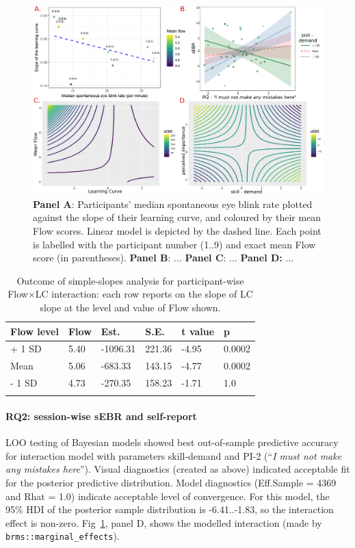 \documentclass[10pt,letterpaper,floatsintext]{article}
\begin{document}
\begin{figure}[!t]
	\centering
	\includegraphics[width=\textwidth]{sEBR_RQ1-2_results}
	\caption{\textbf{Panel A}: Participants' median spontaneous eye blink rate plotted against the slope of their learning curve, and coloured by their mean Flow scores. Linear model is depicted by the dashed line. Each point is labelled with the participant number (1..9) and exact mean Flow score (in parentheses). \textbf{Panel B}: ... \textbf{Panel C}: ... \textbf{Panel D:} ...}
	\label{fig:EBRvLC}
\end{figure}


\begin{table}[!hb]
\centering
\caption{Outcome of simple-slopes analysis for participant-wise Flow$\times$LC interaction: each row reports on the slope of LC slope at the level and value of Flow shown.}
\begin{tabular}{llllll}
\hline
Flow level & Flow & Est. & S.E. & t value & p \\
\hline
+ 1 SD & 5.40 & -1096.31 & 221.36 & -4.95 & 0.0002 \\
Mean   & 5.06 &  -683.33 & 143.15 & -4.77 & 0.0002 \\
- 1 SD & 4.73 &  -270.35 & 158.23 & -1.71 & 1.0 \\
\hline
\label{tab:simpslopes}
\end{tabular}
\end{table}

\paragraph{RQ2: session-wise sEBR and self-report}
LOO testing of Bayesian models showed best out-of-sample predictive accuracy for interaction model with parameters skill-demand and PI-2 (``\textit{I must not make any mistakes here}''). 
Visual diagnostics (created as above) indicated acceptable fit for the posterior predictive distribution. Model diagnostics (Eff.Sample = 4369 and Rhat = 1.0) indicate acceptable level of convergence. For this model, the 95\% HDI of the posterior sample distribution is -6.41..-1.83, so the interaction effect is non-zero. Fig~\ref{fig:EBRvLC}, panel D, shows the modelled interaction (made by \verb|brms::marginal_effects|).
\end{document}
